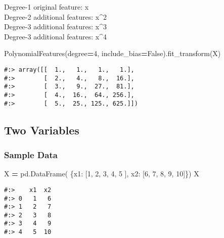 \documentclass[
]{book}
\newenvironment{Shaded}{\begin{snugshade}}{\end{snugshade}}
\newcommand{\DecValTok}[1]{\textcolor[rgb]{0.06,0.06,0.06}{#1}}
\newcommand{\NormalTok}[1]{#1}
\newcommand{\OperatorTok}[1]{\textcolor[rgb]{0.43,0.43,0.43}{\textbf{#1}}}
\newcommand{\StringTok}[1]{\textcolor[rgb]{0.5,0.5,0.5}{#1}}
\newcommand{\VariableTok}[1]{\textcolor[rgb]{0,0,0}{#1}}
\begin{document}
Degree-1 original feature: x\\
Degree-2 additional features: x\^{}2\\
Degree-3 additional features: x\^{}3\\
Degree-3 additional features: x\^{}4

\begin{Shaded}
\begin{Highlighting}[]
\NormalTok{PolynomialFeatures(degree}\OperatorTok{=}\DecValTok{4}\NormalTok{, include\_bias}\OperatorTok{=}\VariableTok{False}\NormalTok{).fit\_transform(X)}
\end{Highlighting}
\end{Shaded}

\begin{verbatim}
#:> array([[  1.,   1.,   1.,   1.],
#:>        [  2.,   4.,   8.,  16.],
#:>        [  3.,   9.,  27.,  81.],
#:>        [  4.,  16.,  64., 256.],
#:>        [  5.,  25., 125., 625.]])
\end{verbatim}

\hypertarget{two-variables}{%
\subsection{Two Variables}\label{two-variables}}

\hypertarget{sample-data-22}{%
\subsubsection{Sample Data}\label{sample-data-22}}

\begin{Shaded}
\begin{Highlighting}[]
\NormalTok{X }\OperatorTok{=}\NormalTok{ pd.DataFrame( \{}\StringTok{\textquotesingle{}x1\textquotesingle{}}\NormalTok{: [}\DecValTok{1}\NormalTok{, }\DecValTok{2}\NormalTok{, }\DecValTok{3}\NormalTok{, }\DecValTok{4}\NormalTok{, }\DecValTok{5}\NormalTok{ ],}
                   \StringTok{\textquotesingle{}x2\textquotesingle{}}\NormalTok{: [}\DecValTok{6}\NormalTok{, }\DecValTok{7}\NormalTok{, }\DecValTok{8}\NormalTok{, }\DecValTok{9}\NormalTok{, }\DecValTok{10}\NormalTok{]\})}
\NormalTok{X}
\end{Highlighting}
\end{Shaded}

\begin{verbatim}
#:>    x1  x2
#:> 0   1   6
#:> 1   2   7
#:> 2   3   8
#:> 3   4   9
#:> 4   5  10
\end{verbatim}
\end{document}
